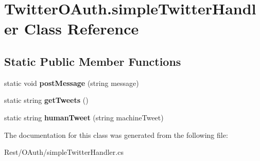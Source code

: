 \hypertarget{class_twitter_o_auth_1_1simple_twitter_handler}{\section{Twitter\-O\-Auth.\-simple\-Twitter\-Handler Class Reference}
\label{class_twitter_o_auth_1_1simple_twitter_handler}
}
\subsection*{Static Public Member Functions}
\begin{DoxyCompactItemize}
\item 
\hypertarget{class_twitter_o_auth_1_1simple_twitter_handler_a7a62737c4321510cc62ef80029553599}{static void {\bfseries post\-Message} (string message)}\label{class_twitter_o_auth_1_1simple_twitter_handler_a7a62737c4321510cc62ef80029553599}

\item 
\hypertarget{class_twitter_o_auth_1_1simple_twitter_handler_a288636312000a949a601cdf228cc53ac}{static string {\bfseries get\-Tweets} ()}\label{class_twitter_o_auth_1_1simple_twitter_handler_a288636312000a949a601cdf228cc53ac}

\item 
\hypertarget{class_twitter_o_auth_1_1simple_twitter_handler_a3fbbba14aac92d01dded546816505edf}{static string {\bfseries human\-Tweet} (string machine\-Tweet)}\label{class_twitter_o_auth_1_1simple_twitter_handler_a3fbbba14aac92d01dded546816505edf}

\end{DoxyCompactItemize}


The documentation for this class was generated from the following file\-:\begin{DoxyCompactItemize}
\item 
Rest/\-O\-Auth/simple\-Twitter\-Handler.\-cs\end{DoxyCompactItemize}
